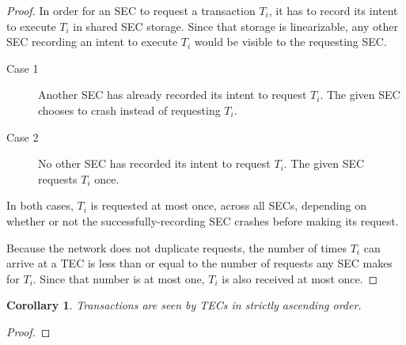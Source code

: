 \documentclass{article}
\newtheorem{corollary}{Corollary}[section]
\begin{document}
\begin{proof}
In order for an SEC to request a transaction $T_i$, it has to record its intent
to execute $T_i$ in shared SEC storage. Since that storage is linearizable, any
other SEC recording an intent to execute $T_i$ would be visible to the
requesting SEC.

\begin{description}
  \item[Case 1] Another SEC has already recorded its intent to request $T_i$.
The given SEC chooses to crash instead of requesting $T_i$.
  \item[Case 2] No other SEC has recorded its intent to request $T_i$. The
given SEC requests $T_i$ once.
\end{description}

In both cases, $T_i$ is requested at most once, across all SECs, depending on
whether or not the successfully-recording SEC crashes before making its
request.

Because the network does not duplicate requests, the number of times $T_i$ can
arrive at a TEC is less than or equal to the number of requests any SEC makes
for $T_i$. Since that number is at most one, $T_i$ is also received at most
once.
\end{proof}

\begin{corollary}
\label{t_strict_order}
Transactions are seen by TECs in strictly ascending order.
\end{corollary}

\begin{proof}
\end{proof}
\end{document}
